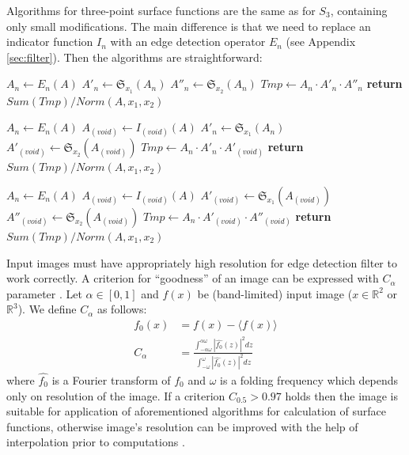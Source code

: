 \documentclass[reprint,amsmath,amssymb,aps,pre,showkeys,showpacs]{revtex4-1}
\begin{document}
Algorithms for three-point surface functions are the same as for $S_3$,
containing only small modifications. The main difference is that we need to
replace an indicator function $I_n$ with an edge detection operator $E_n$
(see Appendix \ref{sec:filter}). Then the algorithms are straightforward:
\begin{algorithmic}[1]
  \State $A_n \gets E_n (A)$
  \State $A'_n \gets \mathfrak{S}_{x_1}(A_n)$
  \State $A''_n \gets \mathfrak{S}_{x_2}(A_n)$
  \State $Tmp \gets A_n \cdot A'_n \cdot A''_n$
  \State \textbf{return} $Sum(Tmp) / Norm(A, x_1, x_2)$
  \EndProcedure

  \State $A_n \gets E_n (A)$
  \State $A_{(void)} \gets I_{(void)} (A)$
  \State $A'_n \gets \mathfrak{S}_{x_1}(A_n)$
  \State $A'_{(void)} \gets \mathfrak{S}_{x_2}(A_{(void)})$
  \State $Tmp \gets A_n \cdot A'_n \cdot A'_{(void)}$
  \State \textbf{return} $Sum(Tmp) / Norm(A, x_1, x_2)$
  \EndProcedure

  \State $A_n \gets E_n (A)$
  \State $A_{(void)} \gets I_{(void)} (A)$
  \State $A'_{(void)} \gets \mathfrak{S}_{x_1}(A_{(void)})$
  \State $A''_{(void)} \gets \mathfrak{S}_{x_2}(A_{(void)})$
  \State $Tmp \gets A_n \cdot A'_{(void)} \cdot A''_{(void)}$
  \State \textbf{return} $Sum(Tmp) / Norm(A, x_1, x_2)$
  \EndProcedure
\end{algorithmic}

Input images must have appropriately high resolution for edge detection filter
to work correctly. A criterion for ``goodness'' of an image can be expressed
with $C_{\alpha}$ parameter \cite{samarin2023robust}. Let $\alpha \in [0, 1]$
and $f(x)$ be (band-limited) input image ($x \in \mathbb{R}^2$ or
$\mathbb{R}^3$). We define $C_\alpha$ as follows:
\begin{equation}
  \begin{aligned}
    f_0(x) &= f(x) - \langle f(x) \rangle \\
    C_\alpha &= \frac{\int_{-\alpha\omega}^{\alpha\omega} |\hat{f_0}(z)|^2
      dz}{\int_{-\omega}^{\omega} |\hat{f_0}(z)|^2 dz}
  \end{aligned}
\end{equation}
where $\hat{f_0}$ is a Fourier transform of $f_0$ and $\omega$ is a folding
frequency which depends only on resolution of the image. If a criterion
$C_{0.5} > 0.97$ holds then the image is suitable for application of
aforementioned algorithms for calculation of surface functions, otherwise
image's resolution can be improved with the help of interpolation prior to
computations \cite{samarin2023robust}.
\end{document}
